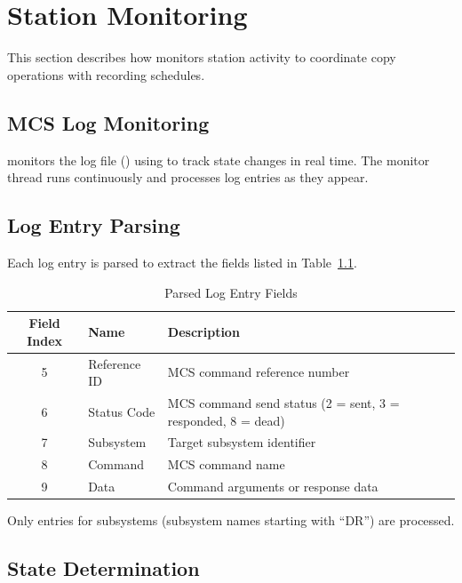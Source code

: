 
\chapter{Station Monitoring}
\label{sec:station-monitoring}

This section describes how \SC{} monitors station activity to coordinate copy operations with \DR{} recording schedules.

\section{MCS Log Monitoring}

\SC{} monitors the \MCS{} log file () using  to track \DR{} state changes in real time. The monitor thread runs continuously and processes log entries as they appear.

\section{Log Entry Parsing}

Each log entry is parsed to extract the fields listed in Table~\ref{tab:log-fields}.

\begin{table}[htbp]
    \centering
    \caption{Parsed Log Entry Fields}
    \label{tab:log-fields}
    \begin{tabular}{clp{6cm}}
        \toprule
        \textbf{Field Index} & \textbf{Name} & \textbf{Description} \\
        \midrule
        5 & Reference ID & MCS command reference number \\
        6 & Status Code & MCS command send status (2 = sent, 3 = responded, 8 = dead) \\
        7 & Subsystem & Target subsystem identifier \\
        8 & Command & MCS command name \\
        9 & Data & Command arguments or response data \\
        \bottomrule
    \end{tabular}
\end{table}

Only entries for \DR{} subsystems (subsystem names starting with ``DR'') are processed.

\section{State Determination}


